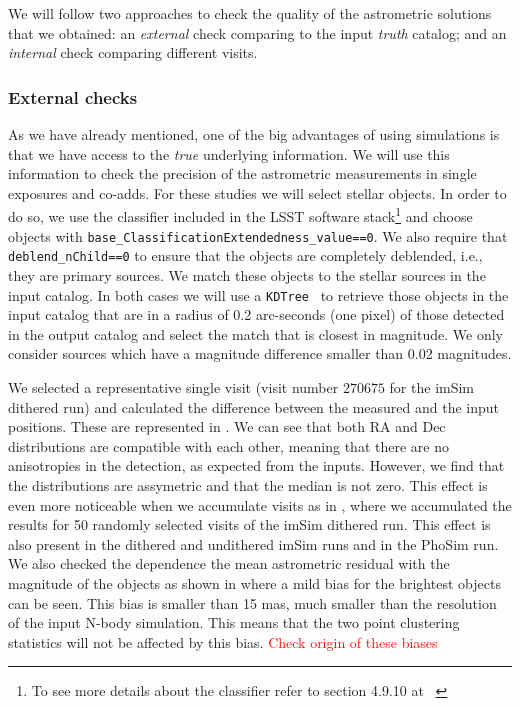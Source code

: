 \documentclass[\docopts]{\docclass}
\begin{document}
We will follow two approaches to check the quality of the astrometric solutions that we obtained: an \textit{external} check
comparing to the input \textit{truth} catalog; and an \textit{internal} check comparing different visits.

\subsubsection{External checks}
\label{sec:external_astrometry}

As we have already mentioned, one of the big advantages of using simulations is that we have access to the \textit{true}
underlying information. We will use this information to check the precision of the astrometric measurements in single exposures
and co-adds. For these studies we will select stellar objects. In order to do so, we use the classifier
included in the LSST software stack\footnote{To see more details about the classifier refer to section 4.9.10 at
~\citep{2017arXiv170506766B}} and choose objects with \texttt{base\_ClassificationExtendedness\_value==0}.
We also require that \texttt{deblend\_nChild==0} to ensure that the objects are completely deblended, i.e., they are primary
sources. We match these objects to the stellar sources in the input catalog. In both cases we will use a
\texttt{KDTree}~\citep{scikit-learn} to retrieve those objects in the input catalog that are in a radius of 0.2 arc-seconds
(one pixel) of those detected in the output catalog and select the match that is closest in magnitude. We only consider sources
which have a magnitude difference smaller than 0.02 magnitudes.

We selected a representative single visit (visit number $270675$ for the imSim dithered run) and calculated the difference
between the measured and the input positions. These are represented in . We can see that both RA and Dec
distributions are compatible with each other, meaning that there are no anisotropies in the detection, as expected from the inputs.
However, we find that the distributions are assymetric and that the median is not zero. This effect is even more noticeable when we
accumulate visits as in , where we accumulated the results for 50 randomly selected visits of the imSim dithered
run. This effect is also present in the dithered and undithered imSim runs and in the PhoSim run. We also checked the dependence the
mean astrometric residual with the magnitude of the objects as shown in  where a mild bias for the brightest
objects can be seen. This bias is smaller than 15 mas, much smaller than the resolution of the input N-body simulation. This means
that the two point clustering statistics will not be affected by this bias.
\textcolor{red}{Check origin of these biases}
\end{document}
